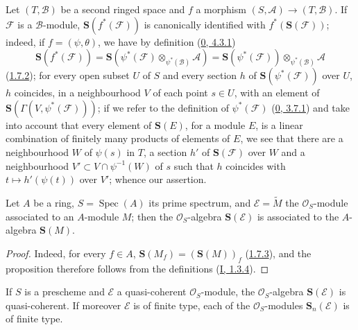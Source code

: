 \begin{env}[1.7.5]
\label{II.1.7.5}
Let $(T,\mathcal{B})$ be a second ringed space and $f$ a morphism
$(S,\mathcal{A})\to(T,\mathcal{B})$. If $\mathcal{F}$ is a
$\mathcal{B}$-module, $\mathbf{S}(f^*(\mathcal{F}))$ is canonically
identified with $f^*(\mathbf{S}(\mathcal{F}))$; indeed, if
$f=(\psi,\theta)$, we have by definition
(\hyperref[0.4.3.1]{0, 4.3.1})
\[
  \mathbf{S}(f^*(\mathcal{F}))
  =\mathbf{S}(\psi^*(\mathcal{F})
    \otimes_{\psi^*(\mathcal{B})}\mathcal{A})
  =\mathbf{S}(\psi^*(\mathcal{F}))
    \otimes_{\psi^*(\mathcal{B})}\mathcal{A}
\]
(\hyperref[II.1.7.2]{1.7.2}); for every open subset $U$ of $S$ and
every section $h$ of $\mathbf{S}(\psi^*(\mathcal{F}))$ over $U$, $h$
coincides, in a neighbourhood $V$ of each point $s\in U$, with an element of
$\mathbf{S}(\Gamma(V,\psi^*(\mathcal{F})))$; if we refer to the
definition of $\psi^*(\mathcal{F})$
(\hyperref[0.3.7.1]{0, 3.7.1}) and take into account that every element
of $\mathbf{S}(E)$, for a module $E$, is a linear combination of finitely
many products of elements of $E$, we see that there are a neighbourhood $W$
of $\psi(s)$ in $T$, a section $h'$ of $\mathbf{S}(\mathcal{F})$ over
$W$ and a neighbourhood $V'\subset V\cap\psi^{-1}(W)$ of $s$ such that $h$
coincides with $t\mapsto h'(\psi(t))$ over $V'$; whence our
assertion.
\end{env}

\begin{proposition}[1.7.6]
\label{II.1.7.6}
Let $A$ be a ring, $S=\operatorname{Spec}(A)$ its prime spectrum, and
$\mathcal{E}=\widetilde{M}$ the $\mathcal{O}_S$-module associated to an
$A$-module $M$; then the $\mathcal{O}_S$-algebra $\mathbf{S}(\mathcal{E})$ is
associated to the $A$-algebra $\mathbf{S}(M)$.
\end{proposition}

\begin{proof}
Indeed, for every $f\in A$,
$\mathbf{S}(M_f)=(\mathbf{S}(M))_f$
(\hyperref[II.1.7.3]{1.7.3}), and the proposition therefore follows from
the definitions (\hyperref[I.1.3.4]{I, 1.3.4}).
\end{proof}

\begin{corollary}[1.7.7]
\label{II.1.7.7}
If $S$ is a prescheme and $\mathcal{E}$ a quasi-coherent
$\mathcal{O}_S$-module, the $\mathcal{O}_S$-algebra $\mathbf{S}(\mathcal{E})$
is quasi-coherent. If moreover $\mathcal{E}$ is of finite type, each of the
$\mathcal{O}_S$-modules $\mathbf{S}_n(\mathcal{E})$ is of finite type.
\end{corollary}

